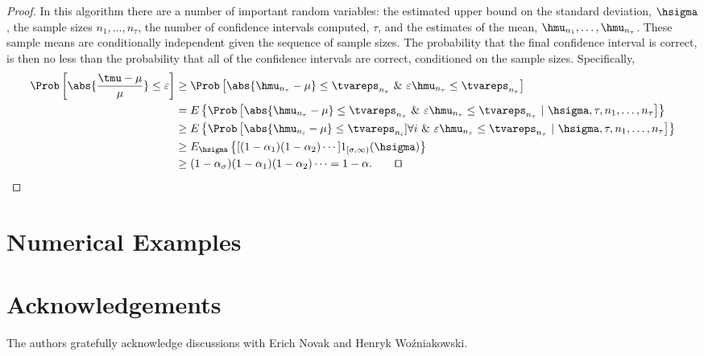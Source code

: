 \documentclass[graybox]{svmult}
\begin{document}
\begin{proof} In this algorithm there are a number of important random variables:  the estimated upper bound on the standard deviation, $\hsigma$, the sample sizes $n_1, \ldots, n_\tau$, the number of confidence intervals computed, $\tau$, and the estimates of the mean, $\hmu_{n_1}, \ldots, \hmu_{n_{\tau}}$. These sample means are conditionally independent given the sequence of sample sizes.  The probability that the final confidence interval is correct, is then no less than the probability that all of the confidence intervals are correct, conditioned on the sample sizes.  Specifically,
\begin{align*}
\Prob\left[\abs{\frac{\tmu-\mu}{\mu}} \le \varepsilon \right] & 
\ge \Prob\left[\abs{\hmu_{n_{\tau}}-\mu} \le \tvareps_{n_{\tau}} \ \& \ \varepsilon \hmu_{n_{\tau}} \le \tvareps_{n_{\tau}} \right] \\
& = E \left\{\Prob\left[\abs{\hmu_{n_{\tau}}-\mu} \le \tvareps_{n_{\tau}} \ \& \ \varepsilon \hmu_{n_{\tau}} \le \tvareps_{n_{\tau}} \ | \ \hsigma, \tau, n_1, \ldots, n_{\tau} \right] \right\} \\
& \ge E \left\{\Prob\left[\abs{\hmu_{n_{i}}-\mu} \le \tvareps_{n_{i}}] \forall i \ \& \ \varepsilon \hmu_{n_{\tau}} \le \tvareps_{n_{\tau}} \ | \ \hsigma, \tau, n_1, \ldots, n_{\tau} \right] \right\} \\
& \ge E_{\hsigma} \left\{[(1-\alpha_1)(1-\alpha_2) \cdots] 1_{[\sigma,\infty)}(\hsigma) \right\}\\
& \ge (1-\alpha_{\sigma}) (1-\alpha_1)(1-\alpha_2) \cdots = 1-\alpha. \qquad \qed
\end{align*}
\end{proof}


\section{Numerical Examples}

\section*{Acknowledgements} The authors gratefully acknowledge discussions with Erich Novak and Henryk Wo\'zniakowski.



\end{document}
